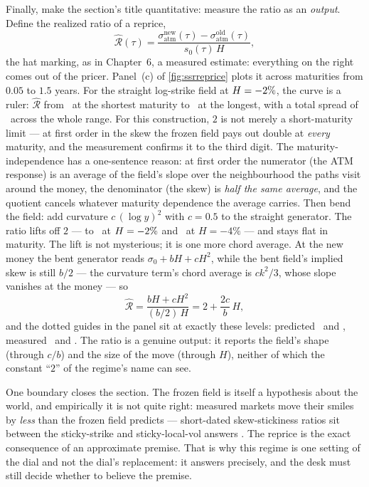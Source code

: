 Finally, make the section's title quantitative: measure the ratio as
an \emph{output}.  Define the realized ratio of a reprice,
\[
\widehat{\mathcal{R}}(\tau)
=\frac{\sigma_{\mathrm{atm}}^{\mathrm{new}}(\tau)
-\sigma_{\mathrm{atm}}^{\mathrm{old}}(\tau)}{s_0(\tau)\,H},
\]
the hat marking, as in Chapter~6, a measured estimate: everything on
the right comes out of the pricer.  Panel~(c) of
\cref{fig:ssrreprice} plots it across maturities from $0.05$ to $1.5$
years.  For the straight log-strike field at
$H=-2\%$, the curve is a ruler:
$\widehat{\mathcal{R}}$ from \MacSsrRepFlatShort\ at the shortest
maturity to \MacSsrRepFlatLong\ at the longest, with a total spread of
\MacSsrRepFlatSpread\ across the whole range.  For this construction,
$2$ is not merely a short-maturity limit --- at first order in the
skew the frozen field pays out double at \emph{every} maturity, and
the measurement confirms it to the third digit.  The
maturity-independence has a one-sentence reason: at first order the
numerator (the ATM response) is an average of the field's slope over
the neighbourhood the paths visit around the money, the denominator
(the skew) is \emph{half the same average}, and the quotient cancels
whatever maturity dependence the average carries.  Then bend the
field:
add curvature $c\,(\log y)^2$ with $c=0.5$ to the straight generator.
The ratio lifts off $2$ --- to \MacSsrRepBentMean\ at
$H=-2\%$ and \MacSsrRepBentBigMean\ at
$H=-4\%$ --- and stays flat in maturity.  The lift is not mysterious;
it is one more chord average.  At the new money the bent generator
reads $\sigma_{0}+bH+cH^{2}$, while the bent field's implied skew is
still $b/2$ --- the curvature term's chord average is $ck^{2}/3$,
whose slope vanishes at the money --- so
\[
\widehat{\mathcal{R}}
=\frac{bH+cH^{2}}{(b/2)\,H}
=2+\frac{2c}{b}\,H ,
\]
and the dotted guides in the panel sit at exactly these levels:
predicted \MacSsrRepBentPred\ and \MacSsrRepBentBigPred, measured
\MacSsrRepBentMean\ and \MacSsrRepBentBigMean.  The ratio is a genuine
output: it reports the field's shape (through $c/b$) and the size of
the move (through $H$), neither of which the constant ``$2$'' of the
regime's name can see.

One boundary closes the section.  The frozen field is itself a
hypothesis about the world, and empirically it is not quite right:
measured markets move their smiles by \emph{less} than the frozen
field predicts --- short-dated skew-stickiness ratios sit between the
sticky-strike and sticky-local-vol answers \citep{Bergomi2016}.  The
reprice is the exact consequence of an approximate premise.  That is
why this regime is one setting of the dial and not the dial's
replacement: it answers precisely, and the desk must still decide
whether to believe the premise.
